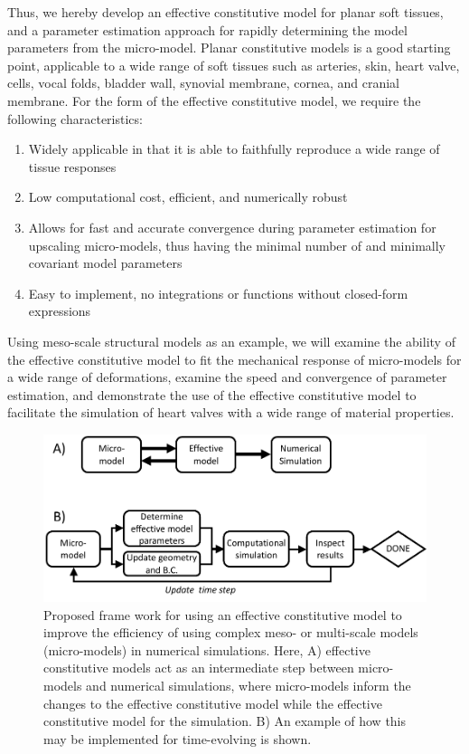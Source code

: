     Thus, we hereby develop an effective constitutive model for planar soft tissues, and a parameter estimation approach for rapidly determining the model parameters from the micro-model. Planar constitutive models is a good starting point, applicable to a wide range of soft tissues such as arteries, skin, heart valve, cells, vocal folds, bladder wall, synovial membrane, cornea, and cranial membrane. For the form of the effective constitutive model, we require the following characteristics:
\begin{enumerate}
    \item Widely applicable in that it is able to faithfully reproduce a wide range of tissue responses
    \item Low computational cost, efficient, and numerically robust
    \item Allows for fast and accurate convergence during parameter estimation for upscaling micro-models, thus having the minimal number of and minimally covariant model parameters
    \item Easy to implement, no integrations or functions without closed-form expressions
\end{enumerate}
Using meso-scale structural models as an example, we will examine the ability of the effective constitutive model to fit the mechanical response of micro-models for a wide range of deformations, examine the speed and convergence of parameter estimation, and demonstrate the use of the effective constitutive model to facilitate the simulation of heart valves with a wide range of material properties.
    
\begin{figure}
\centering
\includegraphics[width=6.5in]{Figures/simulationframework}
\caption{Proposed frame work for using an effective constitutive model to improve the efficiency of using complex meso- or multi-scale models (micro-models) in numerical simulations. Here, A) effective constitutive models act as an intermediate step between micro-models and numerical simulations, where micro-models inform the changes to the effective constitutive model while the effective constitutive model for the simulation. B) An example of how this may be implemented for time-evolving is shown.}
\label{fig:simulationframework}
\end{figure}
    
    
    
    
    
    
    
    
